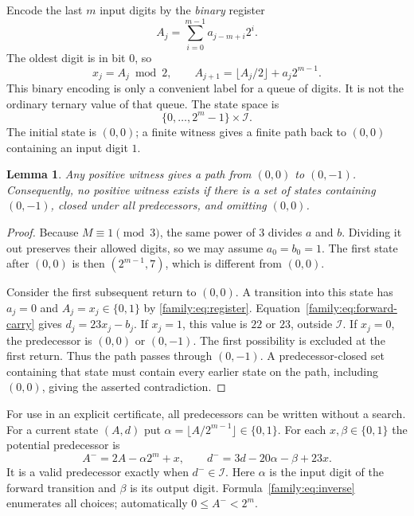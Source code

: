 \documentclass[11pt]{article}
\newtheorem{lemma}[theorem]{Lemma}
\theoremstyle{remark}
\newcommand{\I}{\mathcal I}
\newcommand{\bits}{\{0,1\}}
\begin{document}
Encode the last $m$ input digits by the \emph{binary} register
\[
        A_j=\sum_{i=0}^{m-1}a_{j-m+i}2^i.
\]
The oldest digit is in bit $0$, so
\begin{equation}\label{family:eq:register}
 x_j=A_j\bmod2,\qquad
 A_{j+1}=\lfloor A_j/2\rfloor+a_j2^{m-1}.
\end{equation}
This binary encoding is only a convenient label for a queue of
digits. It is not the ordinary ternary value of that queue.
The state space is
\[
             \{0,\ldots,2^m-1\}\times\I.
\]
The initial state is $(0,0)$; a finite witness gives a finite path
back to $(0,0)$ containing an input digit $1$.

\begin{lemma}\label{family:lem:predecessor}
Any positive witness gives a path from $(0,0)$ to $(0,-1)$.
Consequently, no positive witness exists if there is a set of states
containing $(0,-1)$, closed under all predecessors, and omitting
$(0,0)$.
\end{lemma}
\begin{proof}
Because $M\equiv1\pmod3$, the same power of $3$ divides $a$ and $b$.
Dividing it out preserves their allowed digits, so we may assume
$a_0=b_0=1$. The first state after $(0,0)$ is then
$(2^{m-1},7)$, which is different from $(0,0)$.

Consider the first subsequent return to $(0,0)$. A transition into
this state has $a_j=0$ and $A_j=x_j\in\bits$ by
\eqref{family:eq:register}. Equation~\eqref{family:eq:forward-carry} gives
$d_j=23x_j-b_j$. If $x_j=1$, this value is $22$ or $23$, outside
$\I$. If $x_j=0$, the predecessor is $(0,0)$ or $(0,-1)$.
The first possibility is excluded at the first return. Thus the
path passes through $(0,-1)$. A predecessor-closed set containing
that state must contain every earlier state on the path, including
$(0,0)$, giving the asserted contradiction.
\end{proof}

For use in an explicit certificate, all predecessors can be written
without a search. For a current state $(A,d)$ put
$\alpha=\lfloor A/2^{m-1}\rfloor\in\bits$. For each $x,\beta\in\bits$
the potential predecessor is
\begin{equation}\label{family:eq:inverse}
 A^-=2A-\alpha2^m+x,\qquad
 d^-=3d-20\alpha-\beta+23x.
\end{equation}
It is a valid predecessor exactly when $d^-\in\I$.
Here $\alpha$ is the input digit of the forward transition and
$\beta$ is its output digit. Formula~\eqref{family:eq:inverse} enumerates
all choices; automatically $0\le A^-<2^m$.
\end{document}
